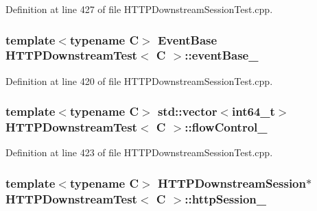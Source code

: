 Definition at line 427 of file H\+T\+T\+P\+Downstream\+Session\+Test.\+cpp.

\subsubsection[{event\+Base\+\_\+}]{\setlength{\rightskip}{0pt plus 5cm}template$<$typename C$>$ Event\+Base {\bf H\+T\+T\+P\+Downstream\+Test}$<$ C $>$\+::event\+Base\+\_\+\hspace{0.3cm}{\ttfamily [protected]}}\label{classHTTPDownstreamTest_ac46b07afb5858b8e9f61a3f2fedd71f5}


Definition at line 420 of file H\+T\+T\+P\+Downstream\+Session\+Test.\+cpp.

\subsubsection[{flow\+Control\+\_\+}]{\setlength{\rightskip}{0pt plus 5cm}template$<$typename C$>$ std\+::vector$<$int64\+\_\+t$>$ {\bf H\+T\+T\+P\+Downstream\+Test}$<$ C $>$\+::flow\+Control\+\_\+\hspace{0.3cm}{\ttfamily [protected]}}\label{classHTTPDownstreamTest_ae1a64adb2ce35eb25406ec7ee75f7692}


Definition at line 423 of file H\+T\+T\+P\+Downstream\+Session\+Test.\+cpp.

\subsubsection[{http\+Session\+\_\+}]{\setlength{\rightskip}{0pt plus 5cm}template$<$typename C$>$ {\bf H\+T\+T\+P\+Downstream\+Session}$\ast$ {\bf H\+T\+T\+P\+Downstream\+Test}$<$ C $>$\+::http\+Session\+\_\+\hspace{0.3cm}{\ttfamily [protected]}}\label{classHTTPDownstreamTest_abad1dfcfd461476fa7e36c2246206672}


